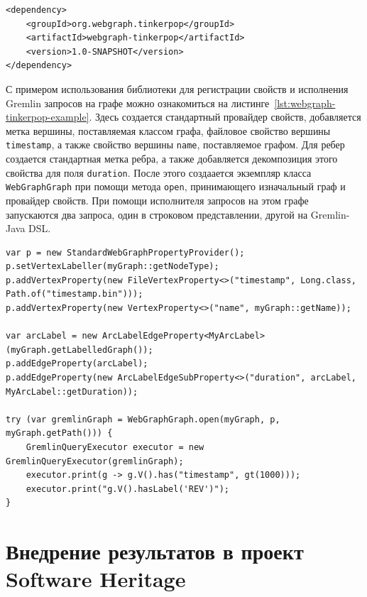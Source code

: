\documentclass[times,specification,annotation]{itmo-student-thesis}
\begin{document}
\begin{lstlisting}[float=!h,caption={Добавление \texttt{webgraph-tinkerpop} в зависимости проекта},label={lst:maven-dep}]
<dependency>
    <groupId>org.webgraph.tinkerpop</groupId>
    <artifactId>webgraph-tinkerpop</artifactId>
    <version>1.0-SNAPSHOT</version>
</dependency>
\end{lstlisting}

С примером использования библиотеки для регистрации свойств и исполнения Gremlin запросов на графе можно ознакомиться на листинге~\ref{lst:webgraph-tinkerpop-example}. Здесь создается стандартный провайдер свойств, добавляется метка вершины, поставляемая классом графа, файловое свойство вершины \texttt{timestamp}, а также свойство вершины \texttt{name}, поставляемое графом. Для ребер создается стандартная метка ребра, а также добавляется декомпозиция этого свойства для поля \texttt{duration}. После этого создаается экземпляр класса \texttt{WebGraphGraph} при помощи метода \texttt{open}, принимающего изначальный граф и провайдер свойств. При помощи исполнителя запросов на этом графе запускаются два запроса, один в строковом представлении, другой на Gremlin-Java DSL.

\begin{lstlisting}[float=!h,caption={Пример использования библиотеки для регистрации свойств и исполнения Gremlin запросов},label={lst:webgraph-tinkerpop-example}]
var p = new StandardWebGraphPropertyProvider();
p.setVertexLabeller(myGraph::getNodeType);
p.addVertexProperty(new FileVertexProperty<>("timestamp", Long.class, Path.of("timestamp.bin")));
p.addVertexProperty(new VertexProperty<>("name", myGraph::getName));

var arcLabel = new ArcLabelEdgeProperty<MyArcLabel>(myGraph.getLabelledGraph());
p.addEdgeProperty(arcLabel);
p.addEdgeProperty(new ArcLabelEdgeSubProperty<>("duration", arcLabel, MyArcLabel::getDuration));

try (var gremlinGraph = WebGraphGraph.open(myGraph, p, myGraph.getPath())) {
    GremlinQueryExecutor executor = new GremlinQueryExecutor(gremlinGraph);
    executor.print(g -> g.V().has("timestamp", gt(1000)));
    executor.print("g.V().hasLabel('REV')");
}
\end{lstlisting}

\section{Внедрение результатов в проект Software Heritage}
\end{document}
